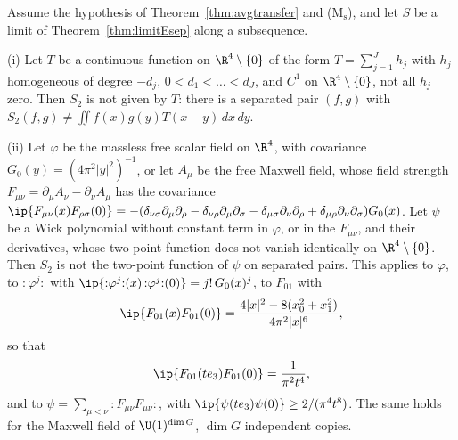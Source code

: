 \begin{proposition}\label{rN5:nomassless}
Assume the hypothesis of Theorem~\textup{\ref{thm:avgtransfer}} and
\textup{(M$_{\mathrm s}$)}, and let $S$ be a limit of
Theorem~\textup{\ref{thm:limitEsep}} along a subsequence.

\textup{(i)} Let $T$ be a continuous function on $\R^4\setminus\{0\}$ of the
form $T=\sum_{j=1}^Jh_j$ with $h_j$ homogeneous of degree $-d_j$, $0<d_1<
\dots<d_J$, and $C^1$ on $\R^4\setminus\{0\}$, not all $h_j$ zero. Then $S_2$
is not given by $T$: there is a separated pair $(f,g)$ with $S_2(f,g)\ne
\iint f(x)g(y)T(x-y)\,dx\,dy$.

\textup{(ii)} Let $\varphi$ be the massless free scalar field on $\R^4$,
with covariance $G_0(y)=(4\pi^2|y|^2)^{-1}$, or let $A_\mu$ be the free
Maxwell field, whose field strength $F_{\mu\nu}=\partial_\mu A_\nu-\partial_\nu
A_\mu$ has the covariance $\ip{F_{\mu\nu}(x)F_{\rho\sigma}(0)}=-(\delta_{\nu
\sigma}\partial_\mu\partial_\rho-\delta_{\nu\rho}\partial_\mu\partial_\sigma-
\delta_{\mu\sigma}\partial_\nu\partial_\rho+\delta_{\mu\rho}\partial_\nu
\partial_\sigma)G_0(x)$. Let $\psi$ be a Wick polynomial without constant term in
$\varphi$, or in the $F_{\mu\nu}$, and their derivatives, whose two-point
function does not vanish identically on $\R^4\setminus\{0\}$. Then $S_2$ is not the two-point
function of $\psi$ on separated pairs. This applies to $\varphi$, to
${:}\varphi^j{:}$ with $\ip{{:}\varphi^j{:}(x)\,{:}\varphi^j{:}(0)}=j!\,G_0(x)^j$,
to $F_{01}$ with
\[
\ip{F_{01}(x)F_{01}(0)}=\frac{4|x|^2-8(x_0^2+x_1^2)}{4\pi^2|x|^6},
\]
so that
\[
\ip{F_{01}(te_3)F_{01}(0)}=\frac1{\pi^2t^4},
\]
and to $\psi=\sum_{\mu<\nu}{:}F_{\mu\nu}F_{\mu\nu}{:}$, with $\ip{\psi(te_3)\psi(0)}
\ge2/(\pi^4t^8)$. The same holds for the Maxwell field of $\U(1)^{\dim G}$,
$\dim G$ independent copies.
\end{proposition}


